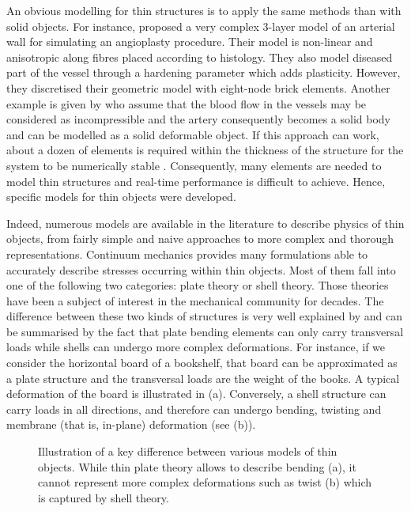 An obvious modelling for thin structures is to apply the same methods than with solid objects. For instance, \cite{Holzapfel02} proposed a very complex 3-layer model of an arterial wall for simulating an angioplasty procedure. Their model is non-linear and anisotropic along fibres placed according to histology. They also model diseased part of the vessel through a hardening parameter which adds plasticity. However, they discretised their geometric model with eight-node brick elements. Another example is given by \cite{Aloisio04} who assume that the blood flow in the vessels may be considered as incompressible and the artery consequently becomes a solid body and can be modelled as a solid deformable object. If this approach can work, about a dozen of elements is required within the thickness of the structure for the system to be numerically stable . Consequently, many elements are needed to model thin structures and real-time performance is difficult to achieve. Hence, specific models for thin objects were developed. 

Indeed, numerous models are available in the literature to describe physics of thin objects, from fairly simple and naive approaches to more complex and thorough representations. Continuum mechanics provides many formulations able to accurately describe stresses occurring within thin objects. Most of them fall into one of the following two categories: plate theory or shell theory. Those theories have been a subject of interest in the mechanical community for decades. The difference between these two kinds of structures is very well explained by \cite{Liu03} and can be summarised by the fact that plate bending elements can only carry transversal loads while shells can undergo more complex deformations. 
For instance, if we consider the horizontal board of a bookshelf, that board can be approximated as a plate structure and the transversal loads are the weight of the books. A typical deformation of the board is illustrated in  (a). Conversely, a shell structure can carry loads in all directions, and therefore can undergo bending, twisting and membrane (that is, in-plane) deformation (see  (b)). 
%
\begin{figure}[ht]
\centering 
{}
\hfill 
{}
\caption[Illustration of the key difference between plate and shell theory]{Illustration of a key difference between various models of thin objects. While thin plate theory allows to describe bending (a), it cannot represent more complex deformations such as twist (b) which is captured by shell theory.}
\label{chap7:fig-boards}
\end{figure}


